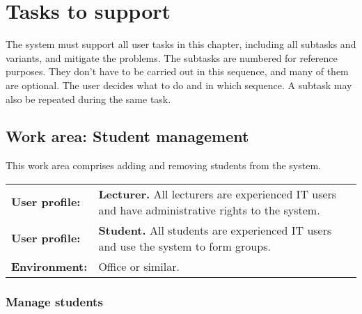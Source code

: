 \documentclass[Main]{subfiles}
\begin{document}
\chapter{Tasks to support}\label{cha:C}
The system must support all user tasks in this chapter, including all subtasks and variants, and mitigate the problems. 
The subtasks are numbered for reference purposes. 
They don't have to be carried out in this sequence, and many of them are optional. 
The user decides what to do and in which sequence. 
A subtask may also be repeated during the same task.



\section{Work area: Student management}
This work area comprises adding and removing students from the system.

\begin{tabular}{l  p{13cm}}
 \textbf{User profile:} & \textbf{Lecturer.} All lecturers are experienced IT users and have administrative rights to the system. \\
 \textbf{User profile:} & \textbf{Student.} All students are experienced IT users and use the system to form groups.  \\
 \textbf{Environment:} & Office or similar.
\end{tabular}



\subsection{Manage students}\label{sec:ManageStudents}

\begin{DataIntro}
\end{DataIntro}
\end{document}
